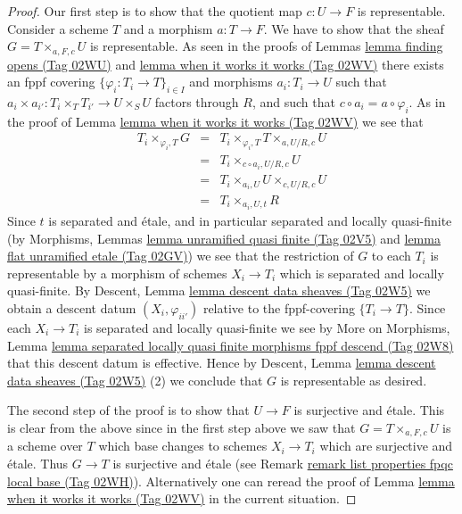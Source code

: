 \documentclass{amsart}
\theoremstyle{plain}
\theoremstyle{definition}
\theoremstyle{remark}
\numberwithin{equation}{subsection}
\begin{document}
\begin{proof}
\medskip\noindent
Our first step is to show that the quotient map
$c : U \to F$ is representable.
Consider a scheme $T$ and a morphism $a : T \to F$.
We have to show that the sheaf $G = T \times_{a, F, c} U$
is representable.
As seen in the proofs of Lemmas \href{https://stacks.math.columbia.edu/tag/02WU}{lemma finding opens (Tag 02WU)} and
\href{https://stacks.math.columbia.edu/tag/02WV}{lemma when it works it works (Tag 02WV)} there exists an fppf covering
$\{\varphi_i : T_i \to T\}_{i \in I}$ and morphisms $a_i : T_i \to U$
such that $a_i \times a_{i'} : T_i \times_T T_{i'} \to U \times_S U$
factors through $R$, and such that $c \circ a_i = a \circ \varphi_i$.
As in the proof of Lemma \href{https://stacks.math.columbia.edu/tag/02WV}{lemma when it works it works (Tag 02WV)} we see that
\begin{eqnarray*}
T_i \times_{\varphi_i, T} G & = &
T_i \times_{\varphi_i, T} T \times_{a, U/R, c} U \\
& = & T_i \times_{c \circ a_i, U/R, c} U \\
& = & T_i \times_{a_i, U} U \times_{c, U/R, c} U \\
& = & T_i \times_{a_i, U, t} R
\end{eqnarray*}
Since $t$ is separated and \'etale, and in particular
separated and locally quasi-finite (by Morphisms, Lemmas
\href{https://stacks.math.columbia.edu/tag/02V5}{lemma unramified quasi finite (Tag 02V5)} and
\href{https://stacks.math.columbia.edu/tag/02GV}{lemma flat unramified etale (Tag 02GV)})
we see that the restriction
of $G$ to each $T_i$ is representable by a morphism of schemes
$X_i \to T_i$ which is separated and locally quasi-finite. By
Descent, Lemma \href{https://stacks.math.columbia.edu/tag/02W5}{lemma descent data sheaves (Tag 02W5)}
we obtain a descent datum $(X_i, \varphi_{ii'})$ relative
to the fppf-covering $\{T_i \to T\}$. Since each
$X_i \to T_i$ is separated and locally quasi-finite we see by
More on Morphisms, Lemma
\href{https://stacks.math.columbia.edu/tag/02W8}{lemma separated locally quasi finite morphisms fppf descend (Tag 02W8)}
that this descent datum is effective.
Hence by
Descent, Lemma \href{https://stacks.math.columbia.edu/tag/02W5}{lemma descent data sheaves (Tag 02W5)} (2)
we conclude that $G$ is representable as desired.

\medskip\noindent
The second step of the proof is to show that $U \to F$ is surjective and
\'etale. This is clear from the above since in the first step above we
saw that $G = T \times_{a, F, c} U$ is a scheme over $T$ which base changes
to schemes $X_i \to T_i$ which are surjective and \'etale. Thus $G \to T$
is surjective and \'etale (see
Remark \href{https://stacks.math.columbia.edu/tag/02WH}{remark list properties fpqc local base (Tag 02WH)}).
Alternatively one can reread the proof of
Lemma \href{https://stacks.math.columbia.edu/tag/02WV}{lemma when it works it works (Tag 02WV)} in the current
situation.


\end{proof}
\end{document}

